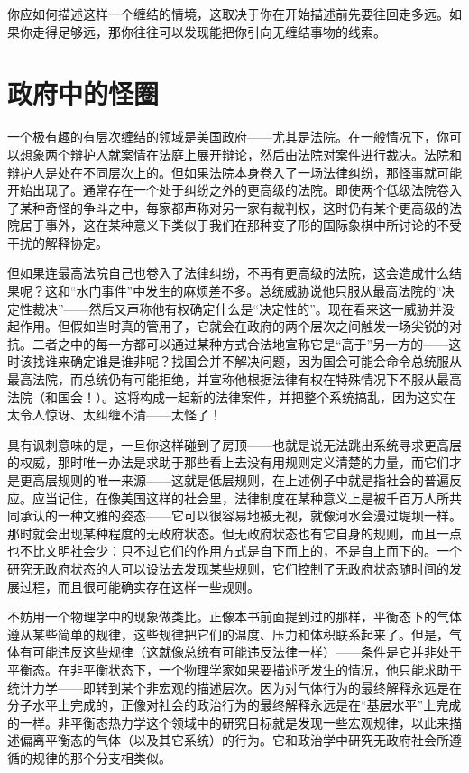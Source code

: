 你应如何描述这样一个缠结的情境，这取决于你在开始描述前先要往回走多远。如果你走得足够远，那你往往可以发现能把你引向无缠结事物的线索。

\section{政府中的怪圈}

一个极有趣的有层次缠结的领域是美国政府——尤其是法院。在一般情况下，你可以想象两个辩护人就案情在法庭上展开辩论，然后由法院对案件进行裁决。法院和辩护人是处在不同层次上的。但如果法院本身卷入了一场法律纠纷，那怪事就可能开始出现了。通常存在一个处于纠纷之外的更高级的法院。即使两个低级法院卷入了某种奇怪的争斗之中，每家都声称对另一家有裁判权，这时仍有某个更高级的法院居于事外，这在某种意义下类似于我们在那种变了形的国际象棋中所讨论的不受干扰的解释协定。

但如果连最高法院自己也卷入了法律纠纷，不再有更高级的法院，这会造成什么结果呢？这和“水门事件”中发生的麻烦差不多。总统威胁说他只服从最高法院的“决定性裁决”——然后又声称他有权确定什么是“决定性的”。现在看来这一威胁并没起作用。但假如当时真的管用了，它就会在政府的两个层次之间触发一场尖锐的对抗。二者之中的每一方都可以通过某种方式合法地宣称它是“高于”另一方的——这时该找谁来确定谁是谁非呢？找国会并不解决问题，因为国会可能会命令总统服从最高法院，而总统仍有可能拒绝，并宣称他根据法律有权在特殊情况下不服从最高法院（和国会！）。这将构成一起新的法律案件，并把整个系统搞乱，因为这实在太令人惊讶、太纠缠不清——太怪了！

具有讽刺意味的是，一旦你这样碰到了房顶——也就是说无法跳出系统寻求更高层的权威，那时唯一办法是求助于那些看上去没有用规则定义清楚的力量，而它们才是更高层规则的唯一来源——这就是低层规则，在上述例子中就是指社会的普遍反应。应当记住，在像美国这样的社会里，法律制度在某种意义上是被千百万人所共同承认的一种文雅的姿态——它可以很容易地被无视，就像河水会漫过堤坝一样。那时就会出现某种程度的无政府状态。但无政府状态也有它自身的规则，而且一点也不比文明社会少：只不过它们的作用方式是自下而上的，不是自上而下的。一个研究无政府状态的人可以设法去发现某些规则，它们控制了无政府状态随时间的发展过程，而且很可能确实存在这样一些规则。

不妨用一个物理学中的现象做类比。正像本书前面提到过的那样，平衡态下的气体遵从某些简单的规律，这些规律把它们的温度、压力和体积联系起来了。但是，气体有可能违反这些规律（这就像总统有可能违反法律一样）——条件是它并非处于平衡态。在非平衡状态下，一个物理学家如果要描述所发生的情况，他只能求助于统计力学——即转到某个非宏观的描述层次。因为对气体行为的最终解释永远是在分子水平上完成的，正像对社会的政治行为的最终解释永远是在“基层水平”上完成的一样。非平衡态热力学这个领域中的研究目标就是发现一些宏观规律，以此来描述偏离平衡态的气体（以及其它系统）的行为。它和政治学中研究无政府社会所遵循的规律的那个分支相类似。

